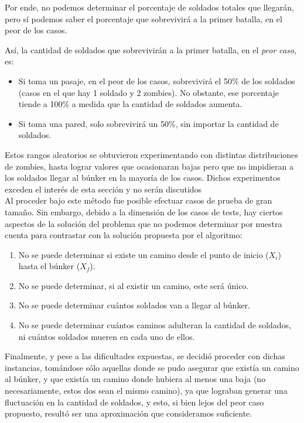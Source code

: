 Por ende, no podemos determinar el porcentaje de soldados totales que llegarán, pero sí podemos saber el porcentaje que sobrevivirá a la primer batalla, en el peor de los casos.

\newpage

Así, la cantidad de soldados que sobrevivir\'an a la primer batalla, en el \emph{peor caso}, es:

\begin{itemize}
	\item Si toma un pasaje, en el peor de los casos, sobrevivirá el 50\% de los soldados (casos en el que hay 1 soldado y 2 zombies). No obstante, ese porcentaje tiende a 100\% a medida que la cantidad de soldados aumenta.
	\item Si toma una pared, solo sobrevivirá un 50\%, sin importar la cantidad de soldados.
\end{itemize}

Estos rangos aleatorios se obtuvieron experimentando con distintas distribuciones de zombies, hasta lograr valores que ocasionaran bajas pero que no impidieran a los soldados llegar al búnker en la mayoría de los casos. Dichos experimentos exceden el interés de esta sección y no serán discutidos\\

Al proceder bajo este m\'etodo fue posible efectuar casos de prueba de gran tamaño. Sin embargo, debido a la dimensi\'on de los casos de tests, hay ciertos aspectos de la soluci\'on del problema que no podemos determinar por nuestra cuenta para contrastar con la soluci\'on propuesta por el algoritmo:

\begin{enumerate}
	\item No se puede determinar si existe un camino desde el punto de inicio ($X_i$) hasta el búnker ($X_f$).
	\item No se puede determinar, si al existir un camino, este será único. 
	\item No se puede determinar cu\'antos soldados van a llegar al búnker.
	\item No se puede determinar cu\'antos caminos adulteran la cantidad de soldados, ni cu\'antos soldados mueren en cada uno de ellos.
\end{enumerate}

Finalmente, y pese a las dificultades expuestas, se decidió proceder con dichas instancias, tom\'andose s\'olo aquellas donde se pudo asegurar que existía un camino al búnker, y que existía un camino donde hubiera al menos una baja (no necesariamente, estos dos sean el mismo camino), ya que lograban generar una fluctuación en la cantidad de soldados, y esto, si bien lejos del peor caso propuesto, resultó ser una aproximación que consideramos suficiente.

